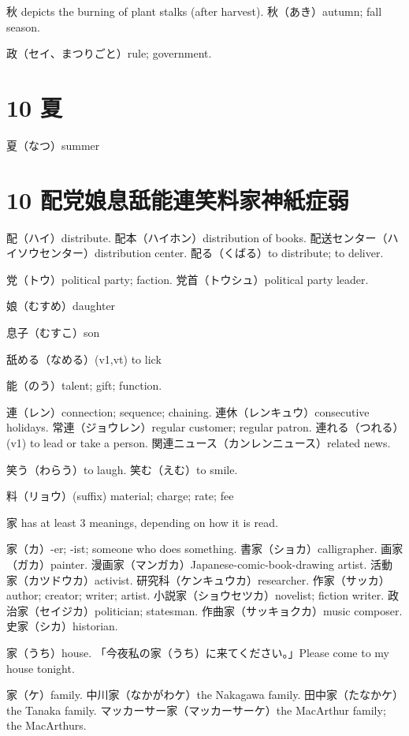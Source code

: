 秋 depicts the burning of plant stalks (after harvest).
秋（あき）autumn; fall season.

政（セイ、まつりごと）rule; government.

\section{10 夏}

夏（なつ）summer

\section{10 配党娘息舐能連笑料家神紙症弱}

配（ハイ）distribute.
配本（ハイホン）distribution of books.
配送センター（ハイソウセンター）distribution center.
配る（くばる）to distribute; to deliver.

党（トウ）political party; faction.
党首（トウシュ）political party leader.

娘（むすめ）daughter

息子（むすこ）son

舐める（なめる）(v1,vt) to lick

能（のう）talent; gift; function.

連（レン）connection; sequence; chaining.
連休（レンキュウ）consecutive holidays.
常連（ジョウレン）regular customer; regular patron.
連れる（つれる）(v1) to lead or take a person.
関連ニュース（カンレンニュース）related news.

笑う（わらう）to laugh.
笑む（えむ）to smile.

料（リョウ）(suffix) material; charge; rate; fee

家 has at least 3 meanings, depending on how it is read.

家（カ）-er; -ist; someone who does something.
書家（ショカ）calligrapher.
画家（ガカ）painter.
漫画家（マンガカ）Japanese-comic-book-drawing artist.
活動家（カツドウカ）activist.
研究科（ケンキュウカ）researcher.
作家（サッカ）author; creator; writer; artist.
小説家（ショウセツカ）novelist; fiction writer.
政治家（セイジカ）politician; statesman.
作曲家（サッキョクカ）music composer.
史家（シカ）historian.

家（うち）house.
「今夜私の家（うち）に来てください。」Please come to my house tonight.

家（ケ）family.
中川家（なかがわケ）the Nakagawa family.
田中家（たなかケ）the Tanaka family.
マッカーサー家（マッカーサーケ）the MacArthur family; the MacArthurs.

